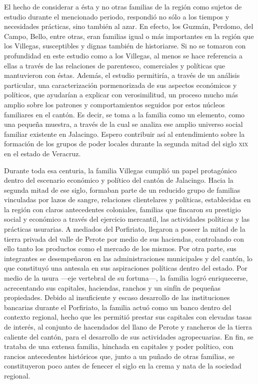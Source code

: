 \documentclass[14pt,twoside,final]{extbook} %
\begin{document}
El hecho de considerar a ésta y no otras familias de la región como sujetos de estudio durante el mencionado periodo, respondió no sólo a los tiempos y necesidades prácticas, sino también al azar. En efecto, los Guzmán, Perdomo, del Campo, Bello, entre otras, eran familias igual o más importantes en la región que los Villegas, susceptibles y dignas también de historiarse. Si no se tomaron con profundidad en este estudio como a los Villegas, al menos se hace referencia a ellas a través de las relaciones de parentesco, comerciales y políticas que mantuvieron con éstas. Además, el estudio permitiría, a través de un análisis particular, una caracterización pormenorizada de sus aspectos económicos y políticos, que ayudarían a explicar con verosimilitud, un proceso mucho más amplio sobre los patrones y comportamientos seguidos por estos núcleos familiares en el cantón. Es decir, se toma a la familia como un elemento, como una pequeña muestra, a través de la cual se analiza ese amplio universo social familiar existente en Jalacingo. Espero contribuir así al entendimiento sobre la formación de los grupos de poder locales durante la segunda mitad del siglo \textsc{xix} en el estado de Veracruz.

Durante toda esa centuria, la familia Villegas cumplió un papel protagónico dentro del escenario económico y político del cantón de Jalacingo. Hacia la segunda mitad de ese siglo, formaban parte de un reducido grupo de familias vinculadas por lazos de sangre, relaciones clientelares y políticas, establecidas en la región con claros antecedentes coloniales, familias que fincaron su prestigio social y económico a través del ejercicio mercantil, las actividades políticas y las prácticas usurarias. A mediados del Porfiriato, llegaron a poseer la mitad de la tierra privada del valle de Perote por medio de sus haciendas, controlando con ello tanto los productos como el mercado de los mismos. Por otra parte, sus integrantes se desempeñaron en las administraciones municipales y del cantón, lo que constituyó una antesala en sus aspiraciones políticas dentro del estado. Por medio de la usura ---eje vertebral de su fortuna---, la familia logró enriquecerse, acrecentando sus capitales, haciendas, ranchos y un sinfín de pequeñas propiedades. Debido al insuficiente y escaso desarrollo de las instituciones bancarias durante el Porfiriato, la familia actuó como un banco dentro del contexto regional, hecho que les permitió prestar sus capitales con elevadas tasas de interés, al conjunto de hacendados del llano de Perote y rancheros de la tierra caliente del cantón, para el desarrollo de sus actividades agropecuarias. En fin, se trataba de una extensa familia, hinchada en capitales y poder político, con rancios antecedentes históricos que, junto a un puñado de otras familias, se constituyeron poco antes de fenecer el siglo en la crema y nata de la sociedad regional.
\end{document}
